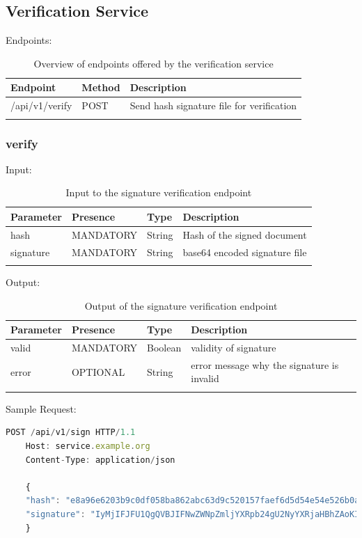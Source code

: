 \subsection{Verification Service}
Endpoints:

\begin{longtable}{|l|l|l|}
    \hline
    \textbf{Endpoint} & \textbf{Method} & \textbf{Description} \\ \hline
    /api/v1/verify & POST & Send hash signature file for verification \\ \hline
    \caption{Overview of endpoints offered by the verification service}
\end{longtable}

\subsubsection{verify}
Input:

\begin{longtable}{|l|l|l|l|}
    \hline
    \textbf{Parameter} & \textbf{Presence} & \textbf{Type} & \textbf{Description} \\ \hline
    hash & MANDATORY & String & Hash of the signed document \\ \hline
    signature & MANDATORY & String & base64 encoded signature file \\ \hline
    \caption{Input to the signature verification endpoint}
\end{longtable}

Output:

\begin{longtable}{|l|l|l|l|}
    \hline
    \textbf{Parameter} & \textbf{Presence} & \textbf{Type} & \textbf{Description} \\ \hline
    valid & MANDATORY & Boolean & validity of signature \\ \hline
    error & OPTIONAL & String & error message why the signature is invalid \\ \hline
    \caption{Output of the signature verification endpoint}
\end{longtable}

Sample Request:
\begin{lstlisting}[caption={sign request}, captionpos=b, language=JavaScript, label={lst:verifyrequest}]
    POST /api/v1/sign HTTP/1.1
    Host: service.example.org
    Content-Type: application/json

    {
    "hash": "e8a96e6203b9c0df058ba862abc63d9c520157faef6d5d54e54e526b0a85b2be",
    "signature": "IyMjIFJFU1QgQVBJIFNwZWNpZmljYXRpb24gU2NyYXRjaHBhZAoKIyMjIyBQcmUtQXV0aCBlbmRw...b2ludCAKIyMjIyMgRW5kcG9pbnQKYGBgUE9TVCAvYXBpL3YxL3NpZ25gYGAK"
    }
\end{lstlisting}

